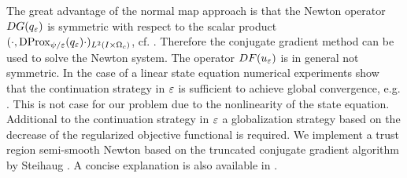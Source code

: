 The great advantage of the normal map approach is that the Newton operator $DG(q_{\varepsilon})$ is symmetric with respect to the scalar product $(\cdot,\operatorname{DProx}_{\psi/ \varepsilon}(q_{\varepsilon})\cdot)_{L^2(I\times\Omega_c)}$, cf. \cite{PieperRund2015,pieperthesis}. Therefore the conjugate gradient method can be used to solve the Newton system. The operator $DF(u_\varepsilon)$ is in general not symmetric. In the case of a linear state equation numerical experiments show that the continuation strategy in $\varepsilon$ is sufficient to achieve global convergence, e.g. \cite{ClasonKunisch:2011b}. This is not case for our problem due to the nonlinearity of the state equation. Additional to the continuation strategy in $\varepsilon$ a globalization strategy based on the decrease of the regularized objective functional is required. We implement a trust region semi-smooth Newton based on the truncated conjugate gradient algorithm by Steihaug \cite{pieperthesis,steihaug1983}.  {\color{red}A concise explanation is also available in \cite[Section 6.2 and A.3]{PieperRund2015}}.

